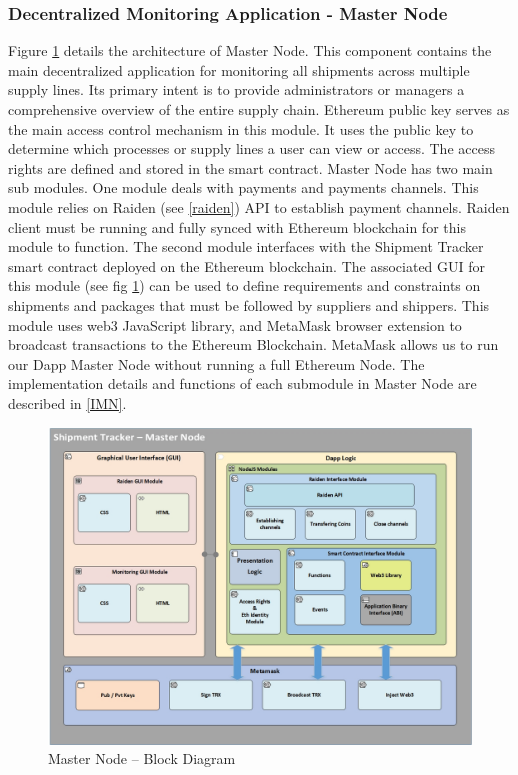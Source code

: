 \subsubsection{Decentralized Monitoring Application - Master Node} \label{MasterNode} 
Figure \ref{fig:ArchitectureMN} details the architecture of  Master Node. This component contains the main decentralized application for monitoring all shipments across multiple supply lines. Its primary intent is to provide administrators or managers a comprehensive overview of the entire supply chain. Ethereum public key serves as the main access control mechanism in this module. It uses the public key to determine which processes or supply lines a user can view or access. The access rights are defined and stored in the smart contract. Master Node has two main sub modules. One module deals with payments and payments channels. This module relies on Raiden (see \ref{raiden}) API to establish payment channels. Raiden client must be running and fully synced with Ethereum blockchain for this module to function. The second module interfaces with the Shipment Tracker smart contract deployed on the Ethereum blockchain. The associated GUI for this module (see fig \ref{fig:ArchitectureMN}) can be used to define requirements and constraints on shipments and packages that must be followed by suppliers and shippers. This module uses web3 JavaScript library, and MetaMask browser extension to broadcast transactions to the Ethereum Blockchain. MetaMask allows us to run our Dapp Master Node without running a full Ethereum Node. The implementation details and functions of each submodule in Master Node are described in \ref{IMN}. 

\begin{figure}[h]
	\centering
    \includegraphics[width=160mm,scale=1]{figs/MasterNode-BD}
	\caption{Master Node – Block Diagram}
	\label{fig:ArchitectureMN} 
\end{figure}
\clearpage
